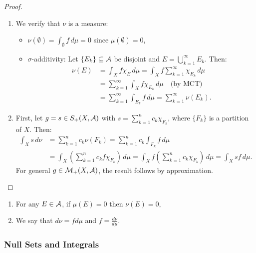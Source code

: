 \begin{proof}
\begin{enumerate}
    \item We verify that $\nu$ is a measure:
    \begin{itemize}
        \item $\nu(\emptyset) = \int_\emptyset f \, d\mu = 0$ since $\mu(\emptyset) = 0$,
        \item $\sigma$-additivity: Let $\{E_k\} \subseteq \mathcal{A}$ be disjoint and $E = \bigcup_{k=1}^{\infty} E_k$. Then:
        \begin{align*}
        \nu(E) &= \int_X f\chi_E \, d\mu = \int_X f\sum_{k=1}^{\infty} \chi_{E_k} \, d\mu \\
        &= \sum_{k=1}^{\infty} \int_X f\chi_{E_k} \, d\mu \quad \text{(by MCT)} \\
        &= \sum_{k=1}^{\infty} \int_{E_k} f \, d\mu = \sum_{k=1}^{\infty} \nu(E_k).
        \end{align*}
    \end{itemize}
    
    \item First, let $g = s \in S_+(X, \mathcal{A})$ with $s = \sum_{k=1}^{n} c_k \chi_{F_k}$, where $\{F_k\}$ is a partition of $X$. Then:
    \begin{align*}
    \int_X s \, d\nu &= \sum_{k=1}^{n} c_k \nu(F_k) = \sum_{k=1}^{n} c_k \int_{F_k} f \, d\mu \\
    &= \int_X \left(\sum_{k=1}^{n} c_k f\chi_{F_k}\right) \, d\mu = \int_X f\left(\sum_{k=1}^{n} c_k \chi_{F_k}\right) \, d\mu = \int_X sf \, d\mu.
    \end{align*}
    For general $g \in \mathcal{M}_+(X, \mathcal{A})$, the result follows by approximation.
\end{enumerate}
\end{proof}

\begin{remark}
\begin{enumerate}
    \item For any $E \in \mathcal{A}$, if $\mu(E) = 0$ then $\nu(E) = 0$,
    \item We say that $d\nu = f d\mu$ and $f = \frac{d\nu}{d\mu}$.
\end{enumerate}
\end{remark}

\clearpage
\subsubsection{Null Sets and Integrals}

